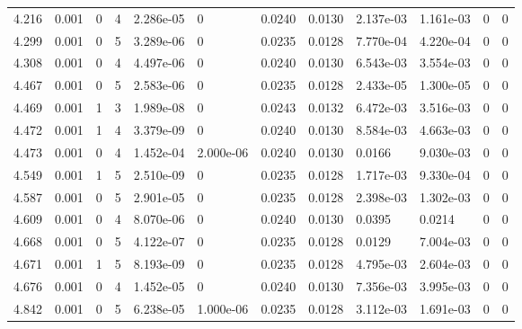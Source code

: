 \documentclass[preview]{standalone}
\begin{document}
{{{\begin{tabular}{L{1.2cm}C{1.2cm} C{0.3cm}C{0.5cm} C{1.4cm}C{1.4cm} C{1.4cm}C{1.4cm} C{1.6cm}C{1.6cm} C{1.6cm}C{1.6cm}}
  4.216  &  0.001  & 0     &  4 &  2.286e-05  & 0  &  0.0240&   0.0130& 2.137e-03 & 1.161e-03   &  0 & 0  \\ 
  4.299  &  0.001  & 0     &  5 &  3.289e-06  & 0  &  0.0235&   0.0128& 7.770e-04 & 4.220e-04   &  0 & 0  \\ 
  4.308  &  0.001  & 0     &  4 &  4.497e-06  & 0  &  0.0240&   0.0130& 6.543e-03 & 3.554e-03   &  0 & 0  \\ 
  4.467  &  0.001  & 0     &  5 &  2.583e-06  & 0  &  0.0235&   0.0128& 2.433e-05 & 1.300e-05   &  0 & 0  \\ 
  4.469  &  0.001  & 1     &  3 &  1.989e-08  & 0  &  0.0243&   0.0132& 6.472e-03 & 3.516e-03   &  0 & 0  \\ 
  4.472  &  0.001  & 1     &  4 &  3.379e-09  & 0  &  0.0240&   0.0130& 8.584e-03 & 4.663e-03   &  0 & 0  \\ 
  4.473  &  0.001  & 0     &  4 &  1.452e-04  & 2.000e-06  &  0.0240&   0.0130& 0.0166 & 9.030e-03   &  0 & 0  \\ 
  4.549  &  0.001  & 1     &  5 &  2.510e-09  & 0  &  0.0235&   0.0128& 1.717e-03 & 9.330e-04   &  0 & 0  \\ 
  4.587  &  0.001  & 0     &  5 &  2.901e-05  & 0  &  0.0235&   0.0128& 2.398e-03 & 1.302e-03   &  0 & 0  \\ 
  4.609  &  0.001  & 0     &  4 &  8.070e-06  & 0  &  0.0240&   0.0130& 0.0395 & 0.0214   &  0 & 0  \\ 
  4.668  &  0.001  & 0     &  5 &  4.122e-07  & 0  &  0.0235&   0.0128& 0.0129 & 7.004e-03   &  0 & 0  \\ 
  4.671  &  0.001  & 1     &  5 &  8.193e-09  & 0  &  0.0235&   0.0128& 4.795e-03 & 2.604e-03   &  0 & 0  \\ 
  4.676  &  0.001  & 0     &  4 &  1.452e-05  & 0  &  0.0240&   0.0130& 7.356e-03 & 3.995e-03   &  0 & 0  \\ 
  4.842  &  0.001  & 0     &  5 &  6.238e-05  & 1.000e-06  &  0.0235&   0.0128& 3.112e-03 & 1.691e-03   &  0 & 0  \\ 
\hline 
\end{tabular} 

}}}
\end{document}

